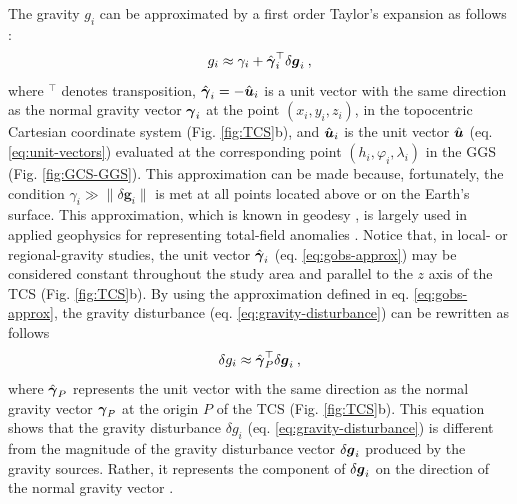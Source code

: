 \documentclass[extra]{gji}
\begin{document}
The gravity $g_{i}$ can be approximated by a first order Taylor's
expansion as follows \citep{sanso_sideris2013}:
\begin{equation}
g_{i} \approx \gamma_{i} +
\hat{\mitbf{\gamma}}_{i}^{\top} \delta \mitbf{g}_{i} \: ,
\label{eq:gobs-approx}
\end{equation}
where $^{\top}$ denotes transposition,
$\hat{\mitbf{\gamma}}_{i} = -\hat{\mitbf{u}}_{i}$ is a unit
vector with the same direction as the normal gravity vector
$\mitbf{\gamma}_{i}$ at the point $(x_{i}, y_{i}, z_{i})$, in the
topocentric Cartesian coordinate system (Fig. \ref{fig:TCS}b), and
$\hat{\mitbf{u}}_{i}$ is the unit vector $\hat{\mitbf{u}}$
(eq. \ref{eq:unit-vectors}) evaluated at the corresponding
point $(h_{i}, \varphi_{i}, \lambda_{i})$ in the
GGS (Fig. \ref{fig:GCS-GGS}).
This approximation can be made because, fortunately,
the condition $\gamma_{i} \gg \| \delta \mathbf{g}_{i} \|$
is met at all points located above or on the Earth's surface.
This approximation, which is known in geodesy \citep[e.g.,][]{sanso_sideris2013},
is largely used in applied geophysics for representing
total-field anomalies \citep[e.g.,][]{blakely1996}.
Notice that, in local- or regional-gravity studies, the unit
vector $\hat{\mitbf{\gamma}}_{i}$ (eq. \ref{eq:gobs-approx})
may be considered constant throughout the study area and
parallel to the $z$ axis of the TCS (Fig. \ref{fig:TCS}b).
By using the approximation defined in eq.
\ref{eq:gobs-approx}, the gravity disturbance
(eq. \ref{eq:gravity-disturbance}) can be rewritten as
follows
\begin{equation}
\delta g_{i} \approx \hat{\mitbf{\gamma}}_{P}^{\top} \delta \mitbf{g}_{i} \: ,
\label{eq:gravity-disturbance-approx-TCS}
\end{equation}
where $\hat{\mitbf{\gamma}}_{P}$ represents the unit vector with
the same direction as the normal gravity vector $\mitbf{\gamma}_{P}$
at the origin $P$ of the TCS (Fig. \ref{fig:TCS}b).
This equation shows that the gravity disturbance $\delta g_{i}$ (eq. \ref{eq:gravity-disturbance}) is different from the magnitude
of the gravity disturbance vector $\delta \mitbf{g}_{i}$
produced by the gravity sources. Rather, it represents the
component of $\delta \mitbf{g}_{i}$ on the direction of the normal
gravity vector \citep{hofmann-wellenhof-moritz2005, sanso_sideris2013}.
\end{document}
